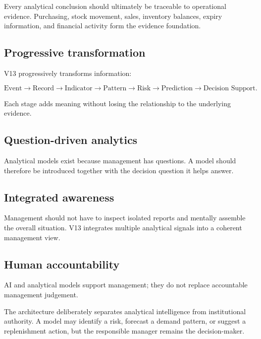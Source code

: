 \documentclass[11pt,a4paper]{article}
\begin{document}
Every analytical conclusion should ultimately be traceable to operational
evidence. Purchasing, stock movement, sales, inventory balances, expiry
information, and financial activity form the evidence foundation.

\subsection{Progressive transformation}

V13 progressively transforms information:

\[
\text{Event} \rightarrow
\text{Record} \rightarrow
\text{Indicator} \rightarrow
\text{Pattern} \rightarrow
\text{Risk} \rightarrow
\text{Prediction} \rightarrow
\text{Decision Support}.
\]

Each stage adds meaning without losing the relationship to the underlying
evidence.

\subsection{Question-driven analytics}

Analytical models exist because management has questions. A model should
therefore be introduced together with the decision question it helps answer.

\subsection{Integrated awareness}

Management should not have to inspect isolated reports and mentally assemble
the overall situation. V13 integrates multiple analytical signals into a
coherent management view.

\subsection{Human accountability}

AI and analytical models support management; they do not replace accountable
management judgement.

\begin{keyidea}
The architecture deliberately separates analytical intelligence from
institutional authority. A model may identify a risk, forecast a demand
pattern, or suggest a replenishment action, but the responsible manager remains
the decision-maker.
\end{keyidea}
\end{document}
